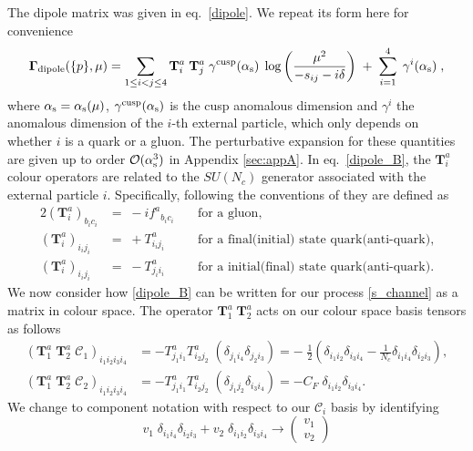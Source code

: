 The dipole matrix was given in eq.~\eqref{dipole}. We repeat its form here for convenience
\begin{equation}\label{dipole_B}
\mathbf{\Gamma}_{\text{dipole}}(\{p\},\mu)  =  \sum_{1\leq i < j \leq 4} \mathbf{T}^a_i \; \mathbf{T}^a_j  \; \gamma^\text{cusp}(\alpha_\mathrm{s}) \; \log\left(\frac{\mu^2}{-s_{ij}-i\delta}\right)  \; + \; \sum_{i=1}^4 \; \gamma^i(\alpha_\mathrm{s}) \; ,
\end{equation}
where $\alpha_\mathrm{s}=\alpha_\mathrm{s}(\mu)$, $\gamma^\text{cusp}(\alpha_\mathrm{s})$ is the cusp anomalous
dimension and $\gamma^i$ the anomalous dimension of the $i$-th
external particle, which only depends on whether $i$ is a quark or a
gluon.  The perturbative expansion for these quantities are given up
to order $\mathcal{O}(\alpha_\mathrm{s}^3)$ in Appendix \ref{sec:appA}.
In eq.~\eqref{dipole_B}, the $\mathbf T^a_i$ colour operators are
related to the
$SU(N_c)$ generator associated with the external particle $i$.
Specifically, following the conventions of \cite{Catani:1996vz} they are defined as
\begin{alignat}{2}
(\mathbf{T}^a_i)_{b_i c_i} &=    \;- i {f ^a}_{b_i c_i} &~&\text{for a gluon},\\
(\mathbf{T}^a_i)_{i_i j_i} &=  \; + T^a_{i_i j_i} &&\text{for a final(initial) state quark(anti-quark)},\\
(\mathbf{T}^a_i)_{i_i j_i} &=  \; - T^a_{j_i i_i} &&\text{for a initial(final) state quark(anti-quark)}.
\end{alignat}
We now consider how \eqref{dipole_B} can be written for our process \eqref{s_channel} as a matrix in colour space. The operator $\mathbf{T}^a_1 \; \mathbf{T}^a_2$ acts on our colour space basis tensors as follows 
\begin{align}
 \left( \mathbf{T}^a_1 \; \mathbf{T}^a_2 \;  \mathcal{C}_1 \right)_{i_1 i_2 i_3 i_4} &= - T^a_{j_1 i_1} T^a_{i_2 j_2} \; (\delta_{ j_1 i_4} \delta_{j_2 i_3})=- \; \frac{1}{2} \left( \delta_{ i_1 i_2} \delta_{i_3 i_4 } - \frac{1}{N_c} \delta_{ i_1 i_4} \delta_{i_2 i_3}  \right), \\[10pt]
\left( \mathbf{T}^a_1 \; \mathbf{T}^a_2 \; \mathcal{C}_2  \right)_{i_1 i_2 i_3 i_4} &= - T^a_{j_1 i_1} T^a_{i_2 j_2} \; (\delta_{ j_1 j_2} \delta_{i_3 i_4 })= -C_F  \;  \delta_{ i_1 i_2} \delta_{i_3 i_4 }.
\end{align}
We change to component notation with respect to our $\mathcal{C}_i$ basis by identifying
\begin{equation}\label{ref1_start}
v_1 \;  \delta_{ i_1 i_4} \delta_{i_2 i_3} + v_2 \; \delta_{ i_1 i_2} \delta_{i_3 i_4 } \rightarrow \begin{pmatrix}
v_1 \\
v_2
\end{pmatrix}
\end{equation}
